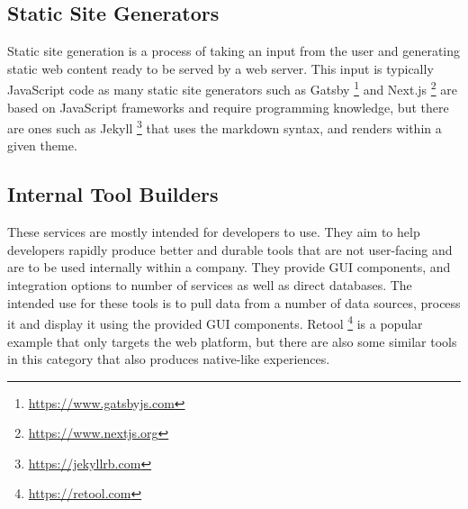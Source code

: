 \subsection{Static Site Generators}

Static site generation is a process of taking an input from the user and generating static web content ready to be served by a web server. This input is typically JavaScript code as many static site generators such as Gatsby \footnote{\url{https://www.gatsbyjs.com}} and Next.js \footnote{\url{https://www.nextjs.org}} are based on JavaScript frameworks and require programming knowledge, but there are ones such as Jekyll \footnote{\url{https://jekyllrb.com}} that uses the markdown syntax, and renders within a given theme.

\subsection{Internal Tool Builders}

These services are mostly intended for developers to use. They aim to help developers rapidly produce better and durable tools that are not user-facing and are to be used internally within a company. They provide GUI components, and integration options to number of services as well as direct databases. The intended use for these tools is to pull data from a number of data sources, process it and display it using the provided GUI components. Retool \footnote{\url{https://retool.com}} is a popular example that only targets the web platform, but there are also some similar tools in this category that also produces native-like experiences.
